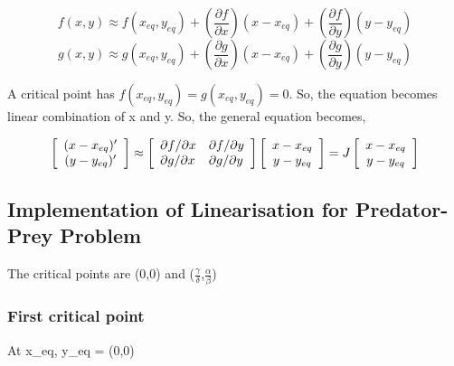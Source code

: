 \documentclass{article}
\begin{document}
\begin{equation*}
    f ( x , y ) \approx f ( x_{eq} , y_{eq} ) + \left( \frac { \partial f } { \partial x } \right) ( x - x_{eq} ) + \left( \frac { \partial f } { \partial y } \right) ( y - y_{eq} )
\end{equation*}
\begin{equation*}
     g ( x , y ) \approx g ( x_{eq} , y_{eq} ) + \left( \frac { \partial g } { \partial x } \right) ( x - x_{eq} ) + \left( \frac { \partial g } { \partial y } \right) ( y - y_{eq} )
\end{equation*}

A critical point has $ f ( x_{eq} , y_{eq} ) = g ( x_{eq} , y_{eq} ) = 0 $. So, the equation becomes linear combination of x and y. So, the general equation becomes,

\begin{equation*}
    \left[ \begin{array} { c } ( x - x_{eq} ) ^ { \prime } \\ ( y - y_{eq} ) ^ { \prime } \end{array} \right] \approx \left[ \begin{array} { l l } \partial f / \partial x & \partial f / \partial y \\ \partial g / \partial x & \partial g / \partial y \end{array} \right] \left[ \begin{array} { c } x - x_{eq} \\ y - y_{eq} \end{array} \right] = J \left[ \begin{array} { c } x - x_{eq} \\ y - y_{eq} \end{array} \right] 
\end{equation*}

\subsection*{Implementation of Linearisation for Predator-Prey Problem}

The critical points are (0,0) and ($\frac{\gamma}{\delta}$,$\frac{\alpha}{\beta}$) \\
\subsubsection*{First critical point}
At x_{eq}, y_{eq} = (0,0) \\
\end{document}
